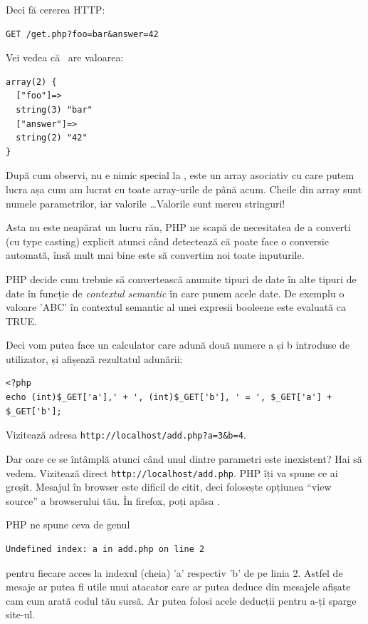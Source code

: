 Deci fă cererea HTTP:
\begin{verbatim}
GET /get.php?foo=bar&answer=42
\end{verbatim}

Vei vedea că \get\ are valoarea:
\begin{verbatim}
array(2) {
  ["foo"]=>
  string(3) "bar"
  ["answer"]=>
  string(2) "42"
}
\end{verbatim}
După cum observi, nu e nimic special la \get, este un array asociativ
cu care putem lucra așa cum am lucrat cu toate array-urile de până acum.
Cheile din array sunt numele parametrilor, iar valorile \ldots Valorile sunt
mereu stringuri!

Asta nu este neapărat un lucru rău, PHP ne scapă de necesitatea de a converti
(cu type casting) explicit atunci când detectează că poate face o conversie
automată, însă mult mai bine este să convertim noi toate inputurile.

PHP decide cum trebuie să convertească anumite tipuri de date în alte tipuri
de date în funcție de \textit{contextul semantic} în care punem acele date. De exemplu
o valoare 'ABC' în contextul semantic al unei expresii booleene este evaluată
ca TRUE.


Deci vom putea face un calculator care adună două numere a și b
introduse de utilizator, și afișează rezultatul adunării:
\begin{lstlisting}
<?php
echo (int)$_GET['a'],' + ', (int)$_GET['b'], ' = ', $_GET['a'] + $_GET['b'];
\end{lstlisting}
Vizitează adresa \texttt{http://localhost/add.php?a=3\&b=4}.

Dar oare ce se întâmplă atunci când unul dintre parametri este inexistent?
Hai să vedem. Vizitează direct \texttt{http://localhost/add.php}. PHP îți
va spune ce ai greșit. Mesajul în browser este dificil de citit, deci
folosește opțiunea ``view source'' a browserului tău. În firefox, poți apăsa
.

PHP ne spune ceva de genul
\begin{verbatim}
Undefined index: a in add.php on line 2
\end{verbatim}
pentru fiecare acces la indexul (cheia) 'a' respectiv 'b'
de pe linia 2. Astfel de mesaje ar putea fi utile unui
atacator care ar putea deduce din mesajele afișate cam cum
arată codul tău sursă. Ar putea folosi acele deducții pentru
a-ți sparge site-ul.

